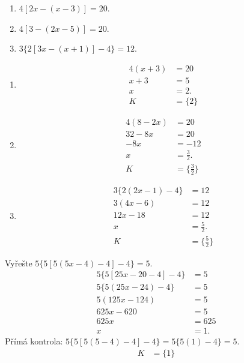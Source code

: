 \documentclass[11pt,a4paper]{article}
\begin{document}
\begin{zadaniReseniBox}[title={Samostatná práce 1}]
\begin{enumerate}[label=\alph*)]
\item $4[2x-(x-3)]=20$.
\item $4[3-(2x-5)]=20$.
\item $3\{2[3x-(x+1)]-4\}=12$.
\end{enumerate}
\tcblower
\begin{enumerate}[label=\alph*)]
\item
\[
\begin{aligned}4(x+3)&=20\\x+3&=5\\x&=2. \\[2mm]
K &= \{2\}
\end{aligned}
\]
\item
\[
\begin{aligned}4(8-2x)&=20\\32-8x&=20\\-8x&=-12\\x&=\tfrac32. \\[2mm]
K &= \{\tfrac32\}
\end{aligned}
\]
\item
\[
\begin{aligned}3\{2(2x-1)-4\}&=12\\3(4x-6)&=12\\12x-18&=12\\x&=\tfrac52. \\[2mm]
K &= \{\tfrac52\}
\end{aligned}
\]
\end{enumerate}
\end{zadaniReseniBox}
\begin{prikladReseniBox}[title={Rozšíření 1}]
Vyřešte $5\{5[5(5x-4)-4]-4\}=5$.
\tcblower
\[
\begin{aligned}
5\{5[25x-20-4]-4\}&=5\\
5\{5(25x-24)-4\}&=5\\
5(125x-124)&=5\\
625x-620&=5\\
625x&=625\\
x&=1.
\end{aligned}
\]
Přímá kontrola: $5\{5[5(5-4)-4]-4\}=5\{5(1)-4\}=5$.
\[
\begin{aligned}
K &= \{1\}
\end{aligned}
\]
\end{prikladReseniBox}
\end{document}
